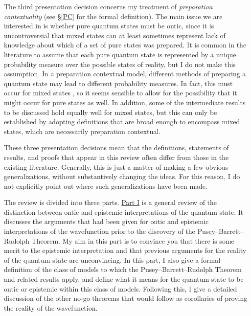\documentclass[DIV=calc,paper=a4,fontsize=11pt,twocolumn]{scrartcl} %
\theoremstyle{definition}
\theoremstyle{plain}
\begin{document}
The third presentation decision concerns my treatment of
\emph{preparation contextuality} (see \S\ref{PC} for the formal
definition).  The main issue we are interested in is whether pure
quantum states must be ontic, since it is uncontroversial that mixed
states can at least sometimes represent lack of knowledge about which
of a set of pure states was prepared.  It is common in the literature
to assume that each pure quantum state is represented by a unique
probability measure over the possible states of reality, but I do not
make this assumption.  In a preparation contextual model, different
methods of preparing a quantum state may lead to different probability
measures.  In fact, this must occur for mixed states
\cite{Spekkens2005}, so it seems sensible to allow for the possibility
that it might occur for pure states as well.  In addition, some of the
intermediate results to be discussed hold equally well for mixed
states, but this can only be established by adopting definitions that
are broad enough to encompass mixed states, which are necessarily
preparation contextual.

These three presentation decisions mean that the definitions,
statements of results, and proofs that appear in this review often
differ from those in the existing literature.  Generally, this is just
a matter of making a few obvious generalizations, without
substantively changing the ideas.  For this reason, I do not
explicitly point out where such generalizations have been made.

The review is divided into three parts.  \hyperref[OED]{Part I} is a general
review of the distinction between ontic and epistemic interpretations
of the quantum state.  It discusses the arguments that had been given
for ontic and epistemic interpretations of the wavefunction prior to
the discovery of the Pusey--Barrett--Rudolph Theorem.  My aim in this part is to convince
you that there is some merit to the epistemic interpretation and that
previous arguments for the reality of the quantum state are
unconvincing.  In this part, I also give a formal definition of the
class of models to which the Pusey--Barrett--Rudolph Theorem and related results apply,
and define what it means for the quantum state to be ontic or
epistemic within this class of models.  Following this, I give a
detailed discussion of the other no-go theorems that would follow as
corollaries of proving the reality of the wavefunction.
\end{document}
